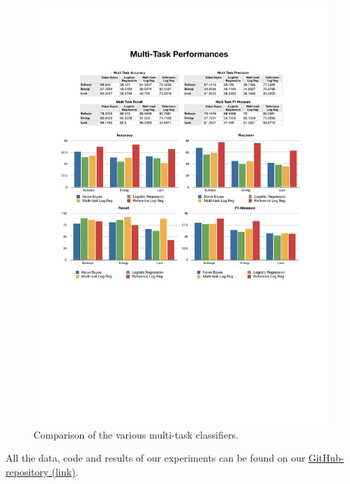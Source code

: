%
\begin{figure}
    \centering
    \setlength{\tabcolsep}{0.0130\linewidth}
    \includegraphics[width=\linewidth]{figures/MultiTask}
    \caption{Comparison of the various multi-task classifiers.%
      \label{fig:multitask}}
\end{figure}


All the data, code and results of our experiments can be found on our 
\href{https://github.com/johnnyyan/515project}{GitHub-repository (link)}.

